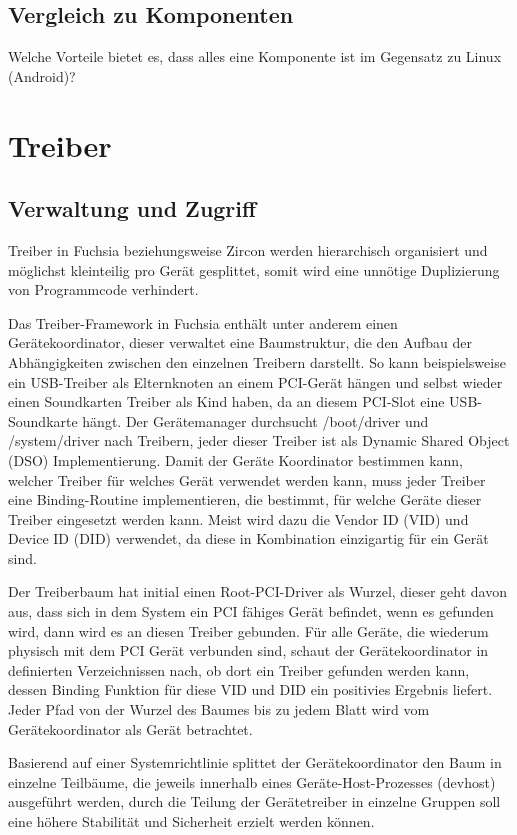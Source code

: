 \documentclass[a4paper]{scrartcl}
\begin{document}
\subsection{Vergleich zu Komponenten}
Welche Vorteile bietet es, dass alles eine Komponente ist im Gegensatz zu Linux (Android)?
\section{Treiber}
\subsection{Verwaltung und Zugriff}
Treiber in Fuchsia beziehungsweise Zircon werden hierarchisch organisiert und möglichst kleinteilig pro Gerät gesplittet, somit wird eine unnötige Duplizierung von Programmcode verhindert.

Das Treiber-Framework in Fuchsia enthält unter anderem einen Gerätekoordinator, dieser  verwaltet eine Baumstruktur, die den Aufbau der Abhängigkeiten zwischen den einzelnen Treibern darstellt. So kann beispielsweise ein USB-Treiber als Elternknoten an einem PCI-Gerät hängen und selbst wieder einen Soundkarten Treiber als Kind haben, da an diesem PCI-Slot eine USB-Soundkarte hängt. Der Gerätemanager durchsucht /boot/driver und /system/driver nach Treibern, jeder dieser Treiber ist als Dynamic Shared Object (DSO) Implementierung. Damit der Geräte Koordinator bestimmen kann, welcher Treiber für welches Gerät verwendet werden kann, muss jeder Treiber eine Binding-Routine implementieren, die bestimmt, für welche Geräte dieser Treiber eingesetzt werden kann. Meist wird dazu die Vendor ID (VID) und Device ID (DID) verwendet, da diese in Kombination einzigartig für ein Gerät sind. 

Der Treiberbaum hat initial einen Root-PCI-Driver als Wurzel, dieser geht davon aus, dass sich in dem System ein PCI fähiges Gerät befindet, wenn es gefunden wird, dann wird es an diesen Treiber gebunden. Für alle Geräte, die wiederum physisch mit dem PCI Gerät verbunden sind, schaut der Gerätekoordinator in definierten Verzeichnissen nach, ob dort ein Treiber gefunden werden kann, dessen Binding Funktion für diese VID und DID ein positivies Ergebnis liefert. Jeder Pfad von der Wurzel des Baumes bis zu jedem Blatt wird vom Gerätekoordinator als Gerät betrachtet.

Basierend auf einer Systemrichtlinie splittet der Gerätekoordinator den Baum in einzelne Teilbäume, die jeweils innerhalb eines Geräte-Host-Prozesses (devhost) ausgeführt werden, durch die Teilung der Gerätetreiber in einzelne Gruppen soll eine höhere Stabilität und Sicherheit erzielt werden können.
\end{document}
